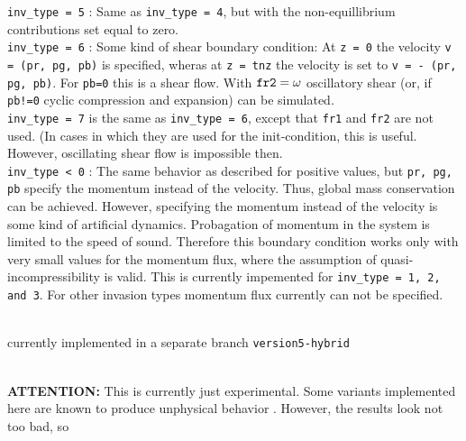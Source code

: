 \documentclass[a4paper]{article}
\begin{document}
\begin{description}
           {\tt inv\_type = 5} :  Same as  {\tt inv\_type = 4}, but with the 
                         non-equillibrium contributions set equal to zero.\\
           {\tt inv\_type = 6} : Some kind of shear boundary condition: At {\tt z = 0}
                         the velocity {\tt v = (pr, pg, pb)} is specified, wheras
                         at {\tt z = tnz} the velocity is set to 
                         {\tt v = - (pr, pg, pb)}. For {\tt pb=0} this is a shear flow.
                         With ${\tt fr2} = \omega$ oscillatory shear (or, if {\tt pb!=0}
                         cyclic compression and expansion) can be simulated. \\
           {\tt inv\_type = 7} is the same as {\tt inv\_type = 6}, except that
                         {\tt fr1} and {\tt fr2} are not used. (In cases in which 
                         they are used for the init-condition, this is useful.
                         However, oscillating shear flow is impossible then.\\
           {\tt inv\_type < 0} : The same behavior as described for positive values, 
                         but  {\tt pr, pg, pb} specify the momentum instead of the 
                         velocity. Thus, global mass conservation can be achieved.
                         However, specifying the momentum instead of the velocity
                         is some kind of artificial dynamics. Probagation of momentum
                         in the system is limited to the speed of sound. Therefore this
                         boundary condition works only with very small values for 
                         the momentum flux, where the assumption of 
                         quasi-incompressibility is valid. This is currently impemented
                         for {\tt inv\_type = 1, 2, {\rm and} 3}. For other invasion
                         types momentum flux currently can not be specified.
         \item[{\tt inv\_fluid=14}: Hybrid boundary]\ \\
                         currently implemented in a separate branch {\tt version5-hybrid}
        \item[{\tt inv\_fluid=15}: Initialization with equillibrium distributions]\ \\
                {\bf ATTENTION:} This is currently just experimental. 
                Some variants implemented here are known to produce unphysical
                behavior \cite{bib:Latt}. However, the results look not too bad, so 

\end{description}
\end{document}
